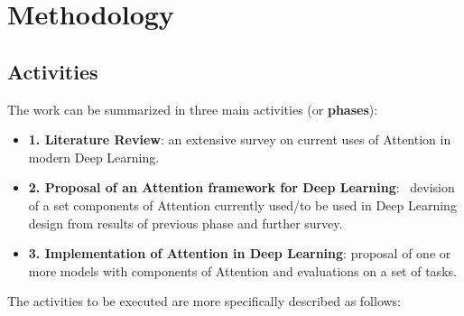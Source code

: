 \documentclass[12pt]{article}
\begin{document}
\let\clearpage\relax
\newpage

\section{Methodology}
\subsection{Activities}
The work can be summarized in three main activities (or \textbf{phases}):
\begin{itemize}
    \item \textbf{1. Literature Review}: an extensive survey on current uses of Attention in modern
        Deep Learning.
    \item \textbf{2. Proposal of an Attention framework for Deep Learning}: \
        devision of a set components of Attention currently used/to be used in Deep Learning design
        from results of previous phase and further survey.
    \item \textbf{3. Implementation of Attention in Deep Learning}:
        proposal of one or more models with components of Attention and evaluations on a set of tasks.
\end{itemize}

The activities to be executed are more specifically described as follows:
\end{document}
